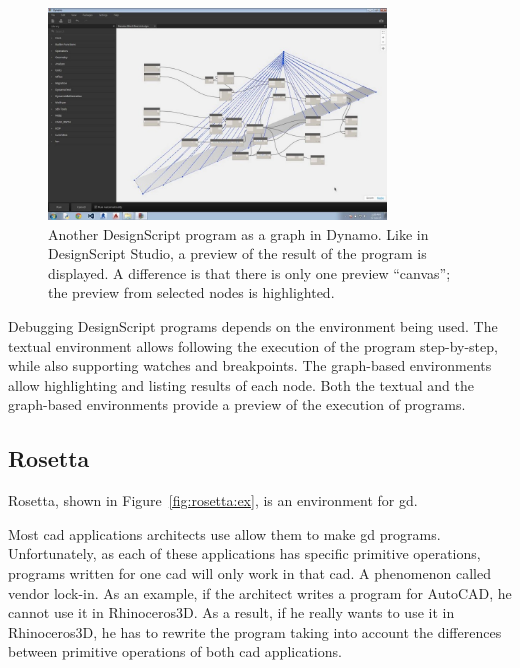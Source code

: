\begin{figure}
	\centering
	\includegraphics[width=0.8\textwidth]{images/ds_dynamo}
	\caption[Another DesignScript program as a graph in Dynamo. Like in DesignScript Studio, a preview of the result of the program is displayed.]{Another DesignScript program as a graph in Dynamo. Like in DesignScript Studio, a preview of the result of the program is displayed. A difference is that there is only one preview ``canvas''; the preview from selected nodes is highlighted.}
	\label{fig:ds:dynamo}
\end{figure}

Debugging DesignScript programs depends on the environment being used.
The textual environment allows following the execution of the program step-by-step, while also supporting watches and breakpoints.
The graph-based environments allow highlighting and listing results of each node.
Both the textual and the graph-based environments provide a preview of the execution of programs.


\subsection{Rosetta}
\label{section:rosetta:related}
Rosetta\cite{de2012modern,lopes2011portable}, shown in Figure~\ref{fig:rosetta:ex}, is an environment for \gls{gd}.

Most \gls{cad} applications architects use allow them to make \gls{gd} programs.
Unfortunately, as each of these applications has specific primitive operations, programs written for one \gls{cad} will only work in that \gls{cad}.
A phenomenon called vendor lock-in.
As an example, if the architect writes a program for AutoCAD, he cannot use it in Rhinoceros3D.
As a result, if he really wants to use it in Rhinoceros3D, he has to rewrite the program taking into account the differences between primitive operations of both \gls{cad} applications.

